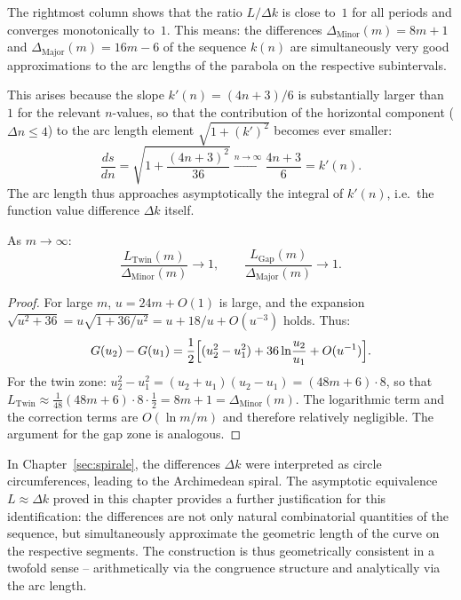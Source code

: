 \begin{tcolorbox}[
  title={Key observation: arc length $\approx$ difference value},
  colback=blue!3,
  colframe=blue!40!black,
  enhanced,
  breakable
]
The rightmost column shows that the ratio $L / \Delta k$ is close to~$1$ for all periods
and converges monotonically to~$1$. This means: the
differences $\Delta_{\mathrm{Minor}}(m) = 8m+1$ and
$\Delta_{\mathrm{Major}}(m) = 16m-6$ of the sequence $k(n)$ are simultaneously
very good approximations to the arc lengths of the parabola on the respective
subintervals.

This arises because the slope $k'(n) = (4n+3)/6$ is substantially
larger than~$1$ for the relevant $n$-values, so that the contribution of the horizontal component
($\Delta n \leq 4$) to the arc length element $\sqrt{1+(k')^2}$ becomes ever
smaller:
\[
  \frac{ds}{dn} = \sqrt{1 + \frac{(4n+3)^2}{36}}
  \xrightarrow{n \to \infty} \frac{4n+3}{6} = k'(n).
\]
The arc length thus approaches asymptotically the integral of $k'(n)$,
i.e.\ the function value difference $\Delta k$ itself.
\end{tcolorbox}

\begin{proposition}
\label{prop:bl_aequivalenz}
As $m \to \infty$:
\[
  \frac{L_{\mathrm{Twin}}(m)}{\Delta_{\mathrm{Minor}}(m)} \to 1,
  \qquad
  \frac{L_{\mathrm{Gap}}(m)}{\Delta_{\mathrm{Major}}(m)} \to 1.
\]
\end{proposition}

\begin{proof}
For large $m$, $u = 24m + O(1)$ is large, and the expansion
$\sqrt{u^2+36} = u\sqrt{1+36/u^2} = u + 18/u + O(u^{-3})$ holds. Thus:
\[
  G(u_2) - G(u_1)
  = \frac{1}{2}\Bigl[(u_2^2 - u_1^2)
    + 36\ln\!\frac{u_2}{u_1}
    + O(u^{-1})\Bigr].
\]
For the twin zone: $u_2^2 - u_1^2 = (u_2+u_1)(u_2-u_1) = (48m+6)\cdot 8$,
so that $L_{\mathrm{Twin}} \approx \frac{1}{48}(48m+6)\cdot 8 \cdot \frac{1}{2}
= 8m + 1 = \Delta_{\mathrm{Minor}}(m)$.
The logarithmic term and the correction terms are $O(\ln m / m)$ and therefore
relatively negligible. The argument for the gap zone is analogous.
\end{proof}

\begin{bemerkung}
In Chapter~\ref{sec:spirale}, the differences $\Delta k$ were
interpreted as circle circumferences, leading to the Archimedean spiral.
The asymptotic equivalence $L \approx \Delta k$ proved in this chapter provides a
further justification for this identification: the differences are
not only natural combinatorial quantities of the sequence, but simultaneously approximate
the geometric length of the curve on the respective segments.
The construction is thus geometrically consistent in a twofold sense --
arithmetically via the congruence structure and analytically via the arc length.
\end{bemerkung}
